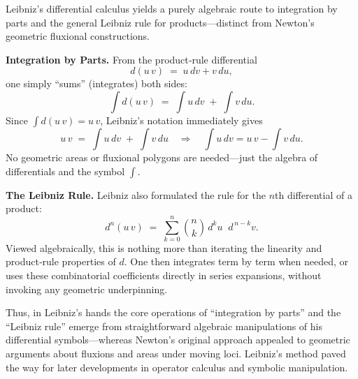 Leibniz’s differential calculus yields a purely algebraic route to integration by parts and the general Leibniz rule for products—distinct from Newton’s geometric fluxional constructions.

\medskip

\noindent\textbf{Integration by Parts.}  From the product‐rule differential
\[
d(u\,v) \;=\; u\,dv + v\,du,
\]
one simply “sums” (integrates) both sides:
\[
\int d(u\,v)
\;=\;
\int u\,dv \;+\; \int v\,du.
\]
Since \(\displaystyle \int d(u\,v)=u\,v\), Leibniz’s notation immediately gives
\[
u\,v \;=\; \int u\,dv \;+\; \int v\,du
\quad\Longrightarrow\quad
\int u\,dv = u\,v - \int v\,du.
\]
No geometric areas or fluxional polygons are needed—just the algebra of differentials and the symbol \(\int\).

\medskip

\noindent\textbf{The Leibniz Rule.}  Leibniz also formulated the rule for the \(n\)th differential of a product:
\[
d^n(u\,v)
\;=\;
\sum_{k=0}^{n} \binom{n}{k}\,d^k u \;\;d^{\,n-k}v.
\]
Viewed algebraically, this is nothing more than iterating the linearity and product‐rule properties of \(d\).  One then integrates term by term when needed, or uses these combinatorial coefficients directly in series expansions, without invoking any geometric underpinning.

\medskip

Thus, in Leibniz’s hands the core operations of “integration by parts” and the “Leibniz rule” emerge from straightforward algebraic manipulations of his differential symbols—whereas Newton’s original approach appealed to geometric arguments about fluxions and areas under moving loci.  Leibniz’s method paved the way for later developments in operator calculus and symbolic manipulation.  


